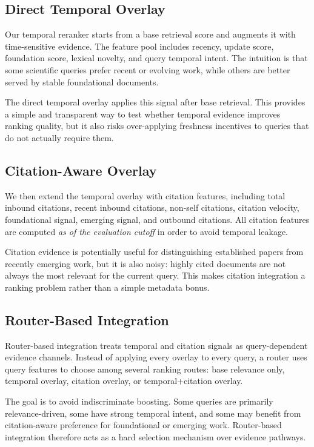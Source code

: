 \documentclass[11pt]{article}
\begin{document}
\subsection{Direct Temporal Overlay}

Our temporal reranker starts from a base retrieval score and augments it with time-sensitive evidence. The feature pool includes recency, update score, foundation score, lexical novelty, and query temporal intent. The intuition is that some scientific queries prefer recent or evolving work, while others are better served by stable foundational documents.

The direct temporal overlay applies this signal after base retrieval. This provides a simple and transparent way to test whether temporal evidence improves ranking quality, but it also risks over-applying freshness incentives to queries that do not actually require them.

\subsection{Citation-Aware Overlay}

We then extend the temporal overlay with citation features, including total inbound citations, recent inbound citations, non-self citations, citation velocity, foundational signal, emerging signal, and outbound citations. All citation features are computed \emph{as of the evaluation cutoff} in order to avoid temporal leakage.

Citation evidence is potentially useful for distinguishing established papers from recently emerging work, but it is also noisy: highly cited documents are not always the most relevant for the current query. This makes citation integration a ranking problem rather than a simple metadata bonus.

\subsection{Router-Based Integration}

Router-based integration treats temporal and citation signals as query-dependent evidence channels. Instead of applying every overlay to every query, a router uses query features to choose among several ranking routes: base relevance only, temporal overlay, citation overlay, or temporal+citation overlay.

The goal is to avoid indiscriminate boosting. Some queries are primarily relevance-driven, some have strong temporal intent, and some may benefit from citation-aware preference for foundational or emerging work. Router-based integration therefore acts as a hard selection mechanism over evidence pathways.
\end{document}
